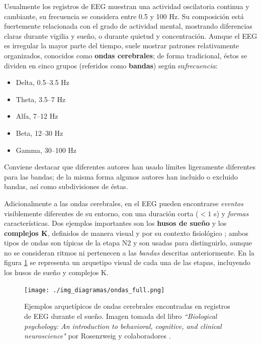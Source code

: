 \documentclass[12pt,letterpaper]{book}
\newcommand{\hz}{\si{\hertz}\xspace}
\begin{document}
Usualmente los registros de EEG muestran una actividad oscilatoria continua y cambiante, su frecuencia se considera entre 0.5 y 100 \hz. 
%
Su composición está fuertemente relacionada con el grado de actividad mental, mostrando diferencias claras durante vigilia y sueño, o durante quietud y concentración. %
%
Aunque el EEG es irregular la mayor parte del tiempo, suele mostrar patrones relativamente 
organizados, conocidos como \textbf{ondas cerebrales}; de forma tradicional, éstos se dividen en cinco grupos (referidos como \textbf{bandas}) según su\textit{frecuencia}:
\begin{itemize}
\item Delta, 0.5--3.5 \hz
\item Theta, 3.5--7 \hz
\item Alfa, 7--12 \hz
\item Beta, 12--30 \hz
\item Gamma, 30--100 \hz
\end{itemize}

Conviene destacar que diferentes autores han usado límites ligeramente diferentes para las bandas; de la misma forma algunos autores han incluido o excluido bandas, así como subdivisiones de éstas.

Adicionalmente a las ondas cerebrales, en el EEG pueden encontrarse \textit{eventos} visiblemente diferentes de su entorno, con 
%
una duración corta ($<1$ s) y \textit{formas} características.
%
Dos ejemplos importantes son los \textbf{husos de sueño} y los \textbf{complejos K}, definidos de manera visual y por su contexto fisiológico \cite{AASM07}; ambos tipos de ondas son típicas de la etapa N2 y son usadas para distinguirlo, aunque no se consideran ritmos ni pertenecen a las \textit{bandas} descritas anteriormente.
%
En la figura \ref{ritmos} se representa un arquetipo visual de cada una de las etapas, incluyendo los husos de sueño y complejos K.

\begin{figure}
\centering
\texttt{[image: ./img\_diagramas/ondas\_full.png]} 
\caption[Ejemplos de ondas cerebrales encontradas en el EEG]
{Ejemplos arquetípicos de ondas cerebrales encontradas en registros de EEG durante el sueño. Imagen tomada del libro \textit{``Biological psychology: An introduction to behavioral, cognitive, and clinical neuroscience"} por Rosenzweig y colaboradores \cite{rosenzweig02}.}
\label{ritmos}
\end{figure}
\end{document}
